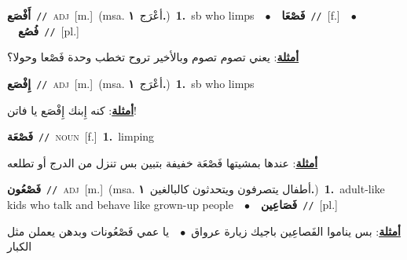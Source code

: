 \documentclass[10pt,a4paper,twoside]{article} %
\begin{document}
\begin{multicols}{2}
{\setlength\topsep{0pt}\textbf{\foreignlanguage{arabic}{أَفْصَع}}\ {\color{gray}\texttt{//}\color{black}}\ \textsc{adj}\ [m.]\ \color{gray}(msa. \foreignlanguage{arabic}{أعْرَج}~\foreignlanguage{arabic}{\textbf{١.}})\color{black}\ \textbf{1.}~sb who limps\ \ $\bullet$\ \ \setlength\topsep{0pt}\textbf{\foreignlanguage{arabic}{فَصْعَا}}\ {\color{gray}\texttt{//}\color{black}}\ [f.]\ \ $\bullet$\ \ \setlength\topsep{0pt}\textbf{\foreignlanguage{arabic}{فُصُع}}\ {\color{gray}\texttt{//}\color{black}}\ [pl.]\  \begin{flushright}\color{gray}\foreignlanguage{arabic}{\textbf{\underline{\foreignlanguage{arabic}{أمثلة}}}: يعني تصوم تصوم وبالأخير تروح تخطب وحدة فَصْعا وحولا؟}\end{flushright}\color{black}} \vspace{2mm}

{\setlength\topsep{0pt}\textbf{\foreignlanguage{arabic}{إِفْصَع}}\ {\color{gray}\texttt{//}\color{black}}\ \textsc{adj}\ [m.]\ \color{gray}(msa. \foreignlanguage{arabic}{أعْرَج}~\foreignlanguage{arabic}{\textbf{١.}})\color{black}\ \textbf{1.}~sb who limps\  \begin{flushright}\color{gray}\foreignlanguage{arabic}{\textbf{\underline{\foreignlanguage{arabic}{أمثلة}}}: كنه إِبنك إِفْصَع يا فاتن!}\end{flushright}\color{black}} \vspace{2mm}

{\setlength\topsep{0pt}\textbf{\foreignlanguage{arabic}{فَصْعَة}}\ {\color{gray}\texttt{//}\color{black}}\ \textsc{noun}\ [f.]\ \textbf{1.}~limping\  \begin{flushright}\color{gray}\foreignlanguage{arabic}{\textbf{\underline{\foreignlanguage{arabic}{أمثلة}}}: عندها بمشيتها فَصْعَة خفيفة بتبين بس تنزل من الدرج أو تطلعه}\end{flushright}\color{black}} \vspace{2mm}

{\setlength\topsep{0pt}\textbf{\foreignlanguage{arabic}{فَصْعُون}}\ {\color{gray}\texttt{//}\color{black}}\ \textsc{adj}\ [m.]\ \color{gray}(msa. \foreignlanguage{arabic}{أطفال يتصرفون ويتحدثون كالبالغين}~\foreignlanguage{arabic}{\textbf{١.}})\color{black}\ \textbf{1.}~adult-like kids who talk and behave like grown-up people\ \ $\bullet$\ \ \setlength\topsep{0pt}\textbf{\foreignlanguage{arabic}{فَصَاعِين}}\ {\color{gray}\texttt{//}\color{black}}\ [pl.]\  \begin{flushright}\color{gray}\foreignlanguage{arabic}{\textbf{\underline{\foreignlanguage{arabic}{أمثلة}}}: بس يناموا الفَصاعِين باجيك زيارة عرواق\ $\bullet$\ \  يا عمي فَصْعُونات وبدهن يعملن مثل الكبار}\end{flushright}\color{black}} \vspace{2mm}


\end{multicols}
\end{document}
